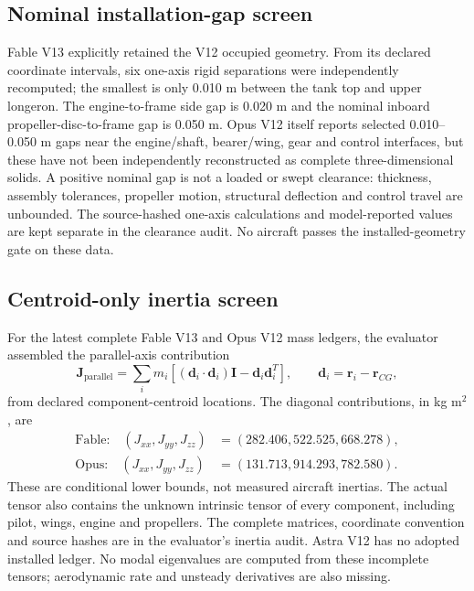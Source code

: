 \documentclass[10pt,letterpaper]{article}
\begin{document}
\subsection{Nominal installation-gap screen}
Fable V13 explicitly retained the V12 occupied geometry. From its declared
coordinate intervals, six one-axis rigid separations were independently
recomputed; the smallest is only 0.010 m between the tank top and upper
longeron. The engine-to-frame side gap is 0.020 m and the nominal inboard
propeller-disc-to-frame gap is 0.050 m. Opus V12 itself reports selected
0.010--0.050 m gaps near the engine/shaft, bearer/wing, gear and control
interfaces, but these have not been independently reconstructed as complete
three-dimensional solids. A positive nominal gap is not a loaded or swept
clearance: thickness, assembly tolerances, propeller motion, structural
deflection and control travel are unbounded. The source-hashed one-axis
calculations and model-reported values are kept separate in the clearance
audit. No aircraft passes the installed-geometry gate on these data.

\subsection{Centroid-only inertia screen}
For the latest complete Fable V13 and Opus V12 mass ledgers, the evaluator
assembled the parallel-axis contribution
\begin{equation}\label{eq:parallelaxis}
\mathbf J_{\mathrm{parallel}}=\sum_i m_i
\left[(\mathbf d_i\cdot\mathbf d_i)\mathbf I-\mathbf d_i\mathbf d_i^T\right],
\qquad \mathbf d_i=\mathbf r_i-\mathbf r_{CG},
\end{equation}
from declared component-centroid locations. The diagonal contributions, in kg m$^2$, are
\begin{align*}
\text{Fable:}\quad (J_{xx},J_{yy},J_{zz})&=(282.406,522.525,668.278),\\
\text{Opus:}\quad (J_{xx},J_{yy},J_{zz})&=(131.713,914.293,782.580).
\end{align*} These are conditional
lower bounds, not measured aircraft inertias. The actual tensor also contains
the unknown intrinsic tensor of every component, including pilot, wings,
engine and propellers. The complete matrices, coordinate convention and
source hashes are in the evaluator's inertia audit. Astra V12 has no adopted
installed ledger. No modal eigenvalues are computed from these incomplete
tensors; aerodynamic rate and unsteady derivatives are also missing.
\end{document}
